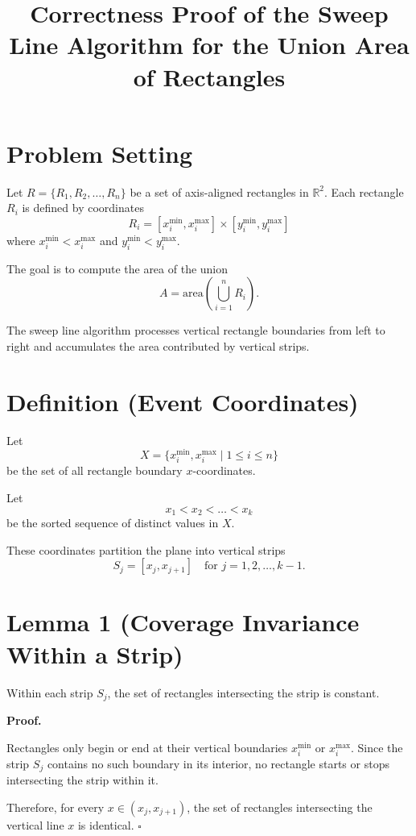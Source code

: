\documentclass{article}
\title{Correctness Proof of the Sweep Line Algorithm for the Union Area of Rectangles}
\author{}
\date{}
\begin{document}
\maketitle

\section*{Problem Setting}

Let $R = \{R_1, R_2, \dots, R_n\}$ be a set of axis-aligned rectangles in $\mathbb{R}^2$.  
Each rectangle $R_i$ is defined by coordinates
\[
R_i = [x_i^{\min}, x_i^{\max}] \times [y_i^{\min}, y_i^{\max}]
\]
where $x_i^{\min} < x_i^{\max}$ and $y_i^{\min} < y_i^{\max}$.

The goal is to compute the area of the union
\[
A = \text{area}\left(\bigcup_{i=1}^{n} R_i\right).
\]

The sweep line algorithm processes vertical rectangle boundaries from left to right and accumulates the area contributed by vertical strips.

\section*{Definition (Event Coordinates)}

Let
\[
X = \{x_i^{\min}, x_i^{\max} \mid 1 \le i \le n\}
\]
be the set of all rectangle boundary $x$-coordinates.

Let
\[
x_1 < x_2 < \dots < x_k
\]
be the sorted sequence of distinct values in $X$.

These coordinates partition the plane into vertical strips
\[
S_j = [x_j, x_{j+1}] \quad \text{for } j = 1,2,\dots,k-1.
\]

\section*{Lemma 1 (Coverage Invariance Within a Strip)}

Within each strip $S_j$, the set of rectangles intersecting the strip is constant.

\textbf{Proof.}

Rectangles only begin or end at their vertical boundaries $x_i^{\min}$ or $x_i^{\max}$.  
Since the strip $S_j$ contains no such boundary in its interior, no rectangle starts or stops intersecting the strip within it.

Therefore, for every $x \in (x_j, x_{j+1})$, the set of rectangles intersecting the vertical line $x$ is identical.  
\hfill $\square$
\end{document}
